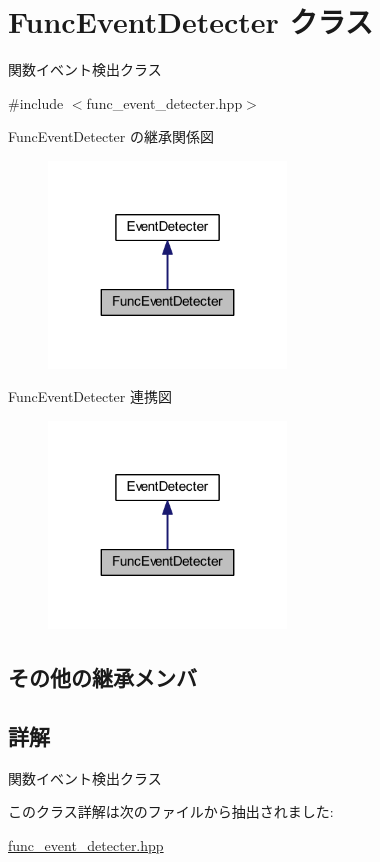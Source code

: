 \hypertarget{class_func_event_detecter}{}\section{Func\+Event\+Detecter クラス}
\label{class_func_event_detecter}


関数イベント検出クラス  




{\ttfamily \#include $<$func\+\_\+event\+\_\+detecter.\+hpp$>$}



Func\+Event\+Detecter の継承関係図\nopagebreak
\begin{figure}[H]
\begin{center}
\leavevmode
\includegraphics[width=179pt]{class_func_event_detecter__inherit__graph}
\end{center}
\end{figure}


Func\+Event\+Detecter 連携図\nopagebreak
\begin{figure}[H]
\begin{center}
\leavevmode
\includegraphics[width=179pt]{class_func_event_detecter__coll__graph}
\end{center}
\end{figure}
\subsection*{その他の継承メンバ}


\subsection{詳解}
関数イベント検出クラス 

このクラス詳解は次のファイルから抽出されました\+:\begin{DoxyCompactItemize}
\item 
\mbox{\hyperlink{func__event__detecter_8hpp}{func\+\_\+event\+\_\+detecter.\+hpp}}\end{DoxyCompactItemize}
